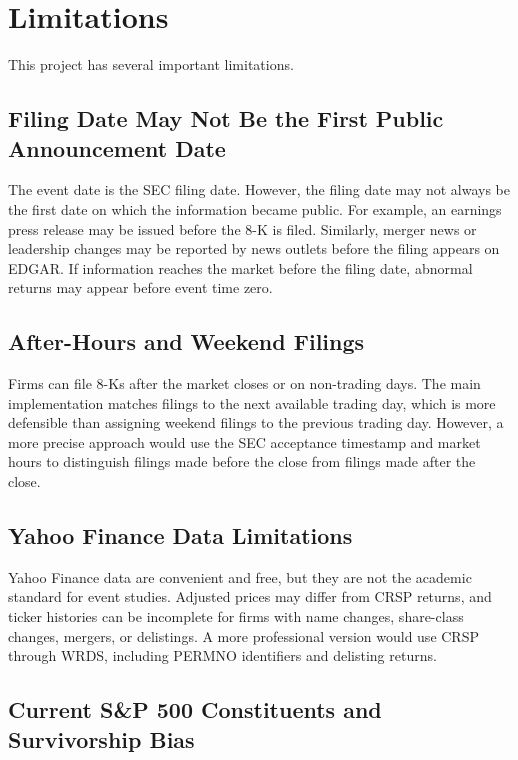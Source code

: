 \documentclass[12pt]{article}
\begin{document}
	\section{Limitations}
	
	This project has several important limitations.
	
	\subsection{Filing Date May Not Be the First Public Announcement Date}
	
	The event date is the SEC filing date. However, the filing date may not always be the first date on which the information became public. For example, an earnings press release may be issued before the 8-K is filed. Similarly, merger news or leadership changes may be reported by news outlets before the filing appears on EDGAR. If information reaches the market before the filing date, abnormal returns may appear before event time zero.
	
	\subsection{After-Hours and Weekend Filings}
	
	Firms can file 8-Ks after the market closes or on non-trading days. The main implementation matches filings to the next available trading day, which is more defensible than assigning weekend filings to the previous trading day. However, a more precise approach would use the SEC acceptance timestamp and market hours to distinguish filings made before the close from filings made after the close.
	
	\subsection{Yahoo Finance Data Limitations}
	
	Yahoo Finance data are convenient and free, but they are not the academic standard for event studies. Adjusted prices may differ from CRSP returns, and ticker histories can be incomplete for firms with name changes, share-class changes, mergers, or delistings. A more professional version would use CRSP through WRDS, including PERMNO identifiers and delisting returns.
	
	\subsection{Current S\&P 500 Constituents and Survivorship Bias}
	
\end{document}
